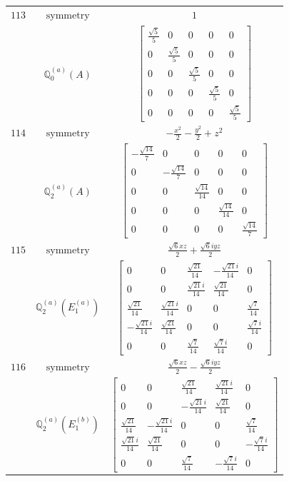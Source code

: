\documentclass[fleqn,8pt,landscape]{jsarticle}
\begin{document}
\begin{longtable}{ccc}
$ 113 $ & $ \text{symmetry} $ & $ 1 $ \\
$  $ & $ \mathbb{Q}_{0}^{(a)}(A) $ & $ \begin{bmatrix} \frac{\sqrt{5}}{5} & 0 & 0 & 0 & 0 \\ 0 & \frac{\sqrt{5}}{5} & 0 & 0 & 0 \\ 0 & 0 & \frac{\sqrt{5}}{5} & 0 & 0 \\ 0 & 0 & 0 & \frac{\sqrt{5}}{5} & 0 \\ 0 & 0 & 0 & 0 & \frac{\sqrt{5}}{5} \end{bmatrix} $ \\ \hline
$ 114 $ & $ \text{symmetry} $ & $ - \frac{x^{2}}{2} - \frac{y^{2}}{2} + z^{2} $ \\
$  $ & $ \mathbb{Q}_{2}^{(a)}(A) $ & $ \begin{bmatrix} - \frac{\sqrt{14}}{7} & 0 & 0 & 0 & 0 \\ 0 & - \frac{\sqrt{14}}{7} & 0 & 0 & 0 \\ 0 & 0 & \frac{\sqrt{14}}{14} & 0 & 0 \\ 0 & 0 & 0 & \frac{\sqrt{14}}{14} & 0 \\ 0 & 0 & 0 & 0 & \frac{\sqrt{14}}{7} \end{bmatrix} $ \\ \hline
$ 115 $ & $ \text{symmetry} $ & $ \frac{\sqrt{6} x z}{2} + \frac{\sqrt{6} i y z}{2} $ \\
$  $ & $ \mathbb{Q}_{2}^{(a)}(E_{1}^{(a)}) $ & $ \begin{bmatrix} 0 & 0 & \frac{\sqrt{21}}{14} & - \frac{\sqrt{21} i}{14} & 0 \\ 0 & 0 & \frac{\sqrt{21} i}{14} & \frac{\sqrt{21}}{14} & 0 \\ \frac{\sqrt{21}}{14} & \frac{\sqrt{21} i}{14} & 0 & 0 & \frac{\sqrt{7}}{14} \\ - \frac{\sqrt{21} i}{14} & \frac{\sqrt{21}}{14} & 0 & 0 & \frac{\sqrt{7} i}{14} \\ 0 & 0 & \frac{\sqrt{7}}{14} & \frac{\sqrt{7} i}{14} & 0 \end{bmatrix} $ \\ \hline
$ 116 $ & $ \text{symmetry} $ & $ \frac{\sqrt{6} x z}{2} - \frac{\sqrt{6} i y z}{2} $ \\
$  $ & $ \mathbb{Q}_{2}^{(a)}(E_{1}^{(b)}) $ & $ \begin{bmatrix} 0 & 0 & \frac{\sqrt{21}}{14} & \frac{\sqrt{21} i}{14} & 0 \\ 0 & 0 & - \frac{\sqrt{21} i}{14} & \frac{\sqrt{21}}{14} & 0 \\ \frac{\sqrt{21}}{14} & - \frac{\sqrt{21} i}{14} & 0 & 0 & \frac{\sqrt{7}}{14} \\ \frac{\sqrt{21} i}{14} & \frac{\sqrt{21}}{14} & 0 & 0 & - \frac{\sqrt{7} i}{14} \\ 0 & 0 & \frac{\sqrt{7}}{14} & - \frac{\sqrt{7} i}{14} & 0 \end{bmatrix} $ \\ \hline

\end{longtable}
\end{document}
